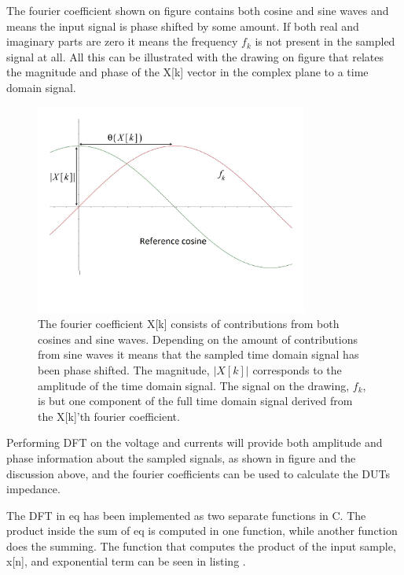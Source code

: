 The fourier coefficient shown on figure  contains both cosine and sine waves and means the input signal is phase shifted by some amount. If both real and imaginary parts are zero it means the frequency $f_k$ is not present in the sampled signal at all. All this can be illustrated with the drawing on figure  that relates the magnitude and phase of the X[k] vector in the complex plane to a time domain signal.

\begin{figure}[H]
    \centering
    \includegraphics[clip, trim=0 0 0 0, width=0.8\textwidth]{Sections/7_SystemDesign/Figures/7_3_2_DFT_TIME.pdf}
    \caption{The fourier coefficient X[k] consists of contributions from both cosines and sine waves. Depending on the amount of contributions from sine waves it means that the sampled time domain signal has been phase shifted. The magnitude, $|X[k]|$ corresponds to the amplitude of the time domain signal. The signal on the drawing, $f_k$, is but one component of the full time domain signal derived from the X[k]'th fourier coefficient.}
    \label{fig:7_3_2_DFTU2}
\end{figure}

Performing DFT on the voltage and currents will provide both amplitude and phase information about the sampled signals, as shown in figure  and the discussion above, and the fourier coefficients can be used to calculate the DUTs impedance.

The DFT in eq  has been implemented as two separate functions in C. The product inside the sum of eq  is computed in one function, while another function does the summing. The function that computes the product of the input sample, x[n], and exponential term can be seen in listing .

